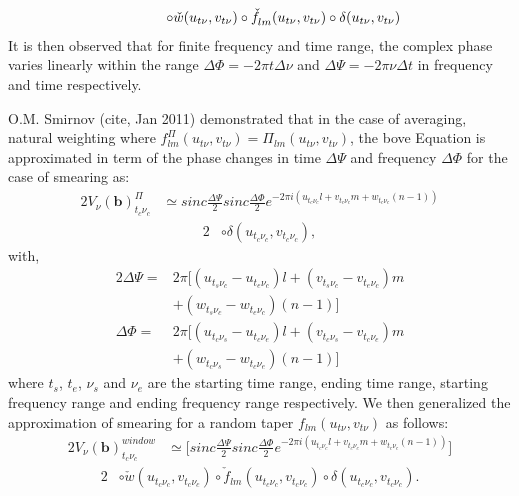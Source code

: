 \begin{alignat}{2}				 
		     \hspace{1.2cm}\circ \check{w}(u_{t\nu},v_{t\nu})\circ \check{f}^{}_{lm}(u_{t\nu},v_{t\nu})\circ\delta(u_{t\nu},v_{t\nu})\label{eq:5} 
\end{alignat}
It is then observed that for finite frequency and time range, the complex phase varies linearly within the range
$\Delta \Phi = −2\pi t\Delta \nu$ and $\Delta \Psi= −2\pi\nu\Delta t$ in frequency and time respectively.


O.M. Smirnov (cite, Jan 2011) demonstrated that in the case of averaging, natural weighting where
$f^{\Pi}_{lm}(u_{t\nu},v_{t\nu})=\Pi_{lm}(u_{t\nu},v_{t\nu})$, the bove Equation is approximated in term of the
phase changes in time $\Delta \Psi$ and frequency  $\Delta \Phi$ for the case
of smearing as:
\begin{alignat*}{2}
V_{\nu}(\mathbf{b})^{\Pi}_{t_c \nu_c} &\simeq sinc\frac{\Delta \Psi}{2}sinc\frac{\Delta \Phi}{2}e^{-2\pi i (u_{t_c\nu_c}l+v_{t_c\nu_c}m+w_{t_c\nu_c}(n-1))}
\end{alignat*}
\begin{alignat}{2}
				      &\circ \delta(u_{t_c\nu_c},v_{t_c\nu_c})\label{eq:6},
\end{alignat}
with,
\begin{alignat*}{2}
\Delta \Psi =&2\pi \Big[(u_{t_s\nu_c}-u_{t_e\nu_c})l + (v_{t_s\nu_c}-v_{t_e\nu_c})m\\
	    & +(w_{t_s\nu_c}-w_{t_e\nu_c})(n-1)\Big]\\
\Delta \Phi =&2\pi \Big[(u_{t_c\nu_s}-u_{t_c\nu_e})l + (v_{t_c\nu_s}-v_{t_c\nu_e})m\\
	    & +(w_{t_c\nu_s}-w_{t_c\nu_e})(n-1)\Big]
\end{alignat*}
where $t_s$, $t_e$, $\nu_s$ and $\nu_e$ are the starting time range, ending time range, starting frequency range and ending frequency
range respectively.
We then generalized the approximation of smearing for a
random taper $f_{lm}(u_{t\nu},v_{t\nu})$ as follows:
\begin{alignat*}{2}
V_{\nu}(\mathbf{b})^{window}_{t_c \nu_c} &\simeq \Bigg[sinc\frac{\Delta \Psi}{2}sinc\frac{\Delta \Phi}{2}e^{-2\pi i (u_{t_c\nu_c}l+v_{t_c\nu_c}m+w_{t_c\nu_c}(n-1))}\Bigg]
\end{alignat*}
\begin{alignat}{2}
					  & \circ \check{w}(u_{t_c\nu_c},v_{t_c\nu_c})\circ \check{f}_{lm}(u_{t_c\nu_c},v_{t_c\nu_c})\circ \delta(u_{t_c\nu_c},v_{t_c\nu_c})\label{eq:5}.
\end{alignat}
